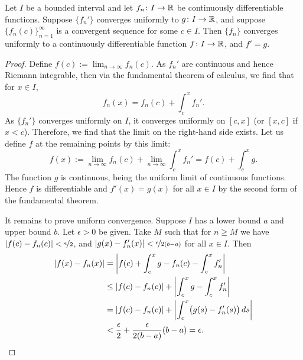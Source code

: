 \begin{thm} \label{thm:dersconverge}
Let $I$ be a bounded interval and let
$f_n \colon I \to {\mathbb{R}}$ be continuously differentiable functions.
Suppose $\{ f_n' \}$ converges uniformly to $g \colon I \to {\mathbb{R}}$,
and suppose $\bigl\{ f_n(c) \bigr\}_{n=1}^\infty$ is a
convergent sequence for some $c \in I$.  Then $\{ f_n \}$ converges uniformly to 
a continuously differentiable function $f \colon I \to {\mathbb{R}}$, and $f' = g$.
\end{thm}

\begin{proof}
Define $f(c) := \lim_{n\to \infty} f_n(c)$.
As $f_n'$ are continuous and hence Riemann integrable,
then
via the fundamental theorem of calculus, we find that for $x \in I$,
\begin{equation*}
f_n(x) = f_n(c) + \int_c^x f_n' .
\end{equation*}
As $\{ f_n' \}$ converges uniformly on $I$, it converges uniformly
on $[c,x]$ (or $[x,c]$ if $x < c$).
Therefore, we find that the limit on the right-hand side exists.
Let us define $f$ at the remaining points by this limit:
\begin{equation*}
f(x) :=
\lim_{n\to\infty} f_n(c) + \lim_{n\to\infty} \int_c^x f_n'
=
f(c) + \int_c^x g .
\end{equation*}
The function $g$ is continuous, being the uniform limit of continuous
functions.  Hence $f$ is differentiable and $f'(x) = g(x)$ for all $x \in I$
by the second form of the fundamental theorem.

It remains to prove
uniform convergence.
Suppose $I$ has a lower bound $a$ and upper bound $b$.
Let $\epsilon > 0$ be given.  Take $M$
such that for $n \geq M$ we have
$\left\lvert {f(c)-f_n(c)} \right\rvert < \nicefrac{\epsilon}{2}$,
and
$\left\lvert {g(x)-f_n'(x)} \right\rvert < \nicefrac{\epsilon}{2(b-a)}$
for all $x \in I$.  Then
\begin{equation*}
\begin{split}
\left\lvert {f(x) - f_n(x)} \right\rvert & =
\left\lvert {f(c) + \int_c^x g - f_n(c) - \int_c^x f_n'} \right\rvert
\\
& \leq
\left\lvert {f(c) - f_n(c)} \right\rvert + \left\lvert {\int_c^x g - \int_c^x f_n'} \right\rvert
\\
& =
\left\lvert {f(c) - f_n(c)} \right\rvert + \left\lvert {\int_c^x \bigl(g(s) - f_n'(s)\bigr) \, ds} \right\rvert
\\
& <
\frac{\epsilon}{2}
+
\frac{\epsilon}{2(b-a)}
(b-a)
=\epsilon. \qedhere
\end{split}
\end{equation*}
\end{proof}

